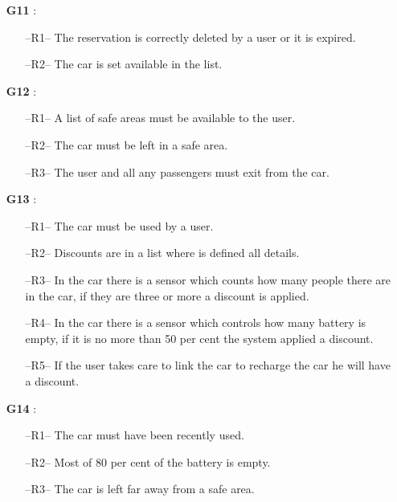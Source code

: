 \begin{itemize}
\item[\textbf{G11}]:
\begin{itemize}
\item[--R1--] The reservation is correctly deleted by a user or it is expired. 
\item[--R2--] The car is set available in the list.

\end{itemize}

\item[\textbf{G12}]:
\begin{itemize}
\item[--R1--] A list of safe areas must be available to the user.
\item[--R2--] The car must be left in a safe area.
\item[--R3--] The user and all any passengers must exit from the car.
\end{itemize}

\item[\textbf{G13}]:
\begin{itemize}
\item[--R1--] The car must be used by a user.
\item[--R2--] Discounts are in a list where is defined all details.
\item[--R3--] In the car there is a sensor which counts how many people there are in the car, if they are three or more a discount is applied.
\item[--R4--] In the car there is a sensor which controls how many battery is empty, if it is no more than 50 per cent the system applied a discount.
\item[--R5--] If the user takes care to link the car to recharge the car he will have a discount.
\end{itemize}

\item[\textbf{G14}]:
\begin{itemize}
\item[--R1--] The car must have been recently used.
\item[--R2--] Most of 80 per cent of the battery is empty.
\item[--R3--] The car is left far away from a safe area.
\end{itemize}














\end{itemize}




